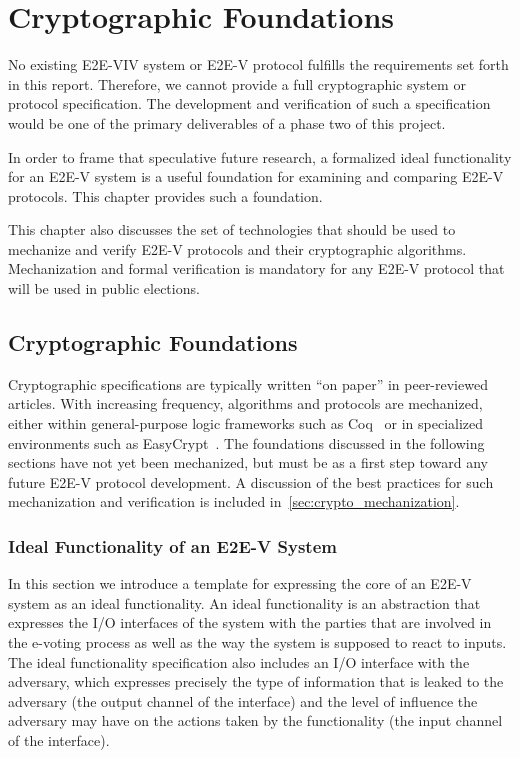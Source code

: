 \chapter{Cryptographic Foundations}
\label{chapter:crypto_spec}

No existing E2E-VIV system or E2E-V protocol fulfills the requirements
set forth in this report. Therefore, we cannot provide a full
cryptographic system or protocol specification.  The development and
verification of such a specification would be one of the primary
deliverables of a phase two of this project.

In order to frame that speculative future research, a formalized ideal
functionality for an E2E-V system is a useful foundation for examining
and comparing E2E-V protocols. This chapter provides such a foundation.

This chapter also discusses the set of technologies that should be
used to mechanize and verify E2E-V protocols and their cryptographic
algorithms. Mechanization and formal verification is mandatory for any
E2E-V protocol that will be used in public elections.

\section{Cryptographic Foundations}

Cryptographic specifications are typically written ``on paper'' in
peer-reviewed articles. With increasing frequency, algorithms and
protocols are mechanized, either within general-purpose logic
frameworks such as Coq~\cite{Coq} or in specialized environments such
as EasyCrypt~\cite{EasyCrypt}. The foundations discussed in the
following sections have not yet been mechanized, but must be as a
first step toward any future E2E-V protocol development. A discussion of
the best practices for such mechanization and verification is included
in~\autoref{sec:crypto_mechanization}.

\subsection{Ideal Functionality of an E2E-V System}

In this section we introduce a template for expressing the core of an
E2E-V system as an ideal functionality. An ideal
functionality is an abstraction that expresses the I/O interfaces of
the system with the parties that are involved in the e-voting process
as well as the way the system is supposed to react to inputs. The
ideal functionality specification also includes an I/O interface with
the adversary, which expresses precisely the type of information that
is leaked to the adversary (the output channel of the interface) and
the level of influence the adversary may have on the actions taken by
the functionality (the input channel of the interface).

